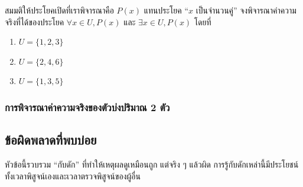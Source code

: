 \begin{exam}
	สมมติให้ประโยคเปิดที่เราพิจารณาคือ $P(x)$ แทนประโยค “$x$ เป็นจำนวนคู่” จงพิจารณาค่าความจริงที่ได้ของประโยค $\forall x \in U, P(x)$ และ $\exists x \in U, P(x)$ โดยที่
	\begin{enumerate}
		\item $U = \{1,2,3\}$
		\item $U = \{2,4,6\}$
		\item $U = \{1,3,5\}$
	\end{enumerate}
\end{exam}

\begin{exam}
	
\end{exam}

\subsubsection{การพิจารณาค่าความจริงของตัวบ่งปริมาณ 2 ตัว}


\subsection{ข้อผิดพลาดที่พบบ่อย}
หัวข้อนี้รวบรวม “กับดัก” ที่ทำให้เหตุผลดูเหมือนถูก แต่จริง ๆ แล้วผิด
การรู้กับดักเหล่านี้มีประโยชน์ทั้งเวลาพิสูจน์เองและเวลาตรวจพิสูจน์ของผู้อื่น

